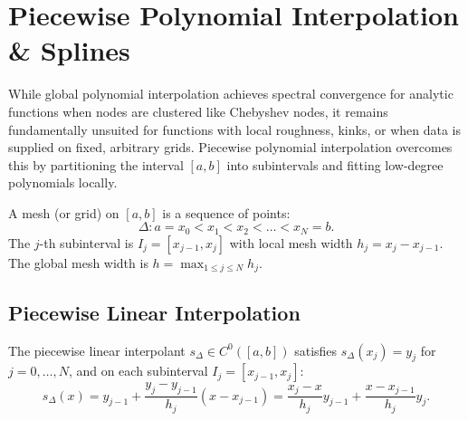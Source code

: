 \section{Piecewise Polynomial Interpolation \& Splines}

While global polynomial interpolation achieves spectral convergence for analytic functions when nodes are clustered like Chebyshev nodes, it remains fundamentally unsuited for functions with local roughness, kinks, or when data is supplied on fixed, arbitrary grids. Piecewise polynomial interpolation overcomes this by partitioning the interval $[a, b]$ into subintervals and fitting low-degree polynomials locally.

\begin{definition}
    A mesh (or grid) on $[a, b]$ is a sequence of points:
    \begin{equation}
        \Delta: a = x_0 < x_1 < x_2 < \dots < x_N = b.
    \end{equation}
    The $j$-th subinterval is $I_j = [x_{j-1}, x_j]$ with local mesh width $h_j = x_j - x_{j-1}$. The global mesh width is $h = \max_{1 \le j \le N} h_j$.
\end{definition}

\subsection{Piecewise Linear Interpolation}

\begin{definition}
    The piecewise linear interpolant $s_{\Delta} \in C^0([a, b])$ satisfies $s_{\Delta}(x_j) = y_j$ for $j=0, \dots, N$, and on each subinterval $I_j = [x_{j-1}, x_j]$:
    \begin{equation}
        s_{\Delta}(x) = y_{j-1} + \frac{y_j - y_{j-1}}{h_j} (x - x_{j-1}) = \frac{x_j - x}{h_j} y_{j-1} + \frac{x - x_{j-1}}{h_j} y_j.
    \end{equation}
\end{definition}

